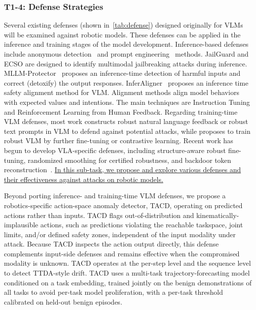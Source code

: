 \subsubsection{T1-4: Defense Strategies} \label{sec:t1_4}



 Several existing defenses (shown in~\autoref{tab:defense}) designed originally for VLMs will be examined against robotic models.
These defenses can be applied in the inference and training stages of the model development.
Inference-based defenses include anonymous detection~\cite{zhang2023mutation,gou2024eyes,pi2024mllm} and prompt engineering~\cite{wu2023jailbreaking,wang2024adashield,chen2023can} methods.%
JailGuard \cite{zhang2023mutation} and ECSO \cite{gou2024eyes} are designed to identify multimodal jailbreaking attacks during inference.
MLLM-Protector~\cite{pi2024mllm} proposes an inference-time detection of harmful inputs and correct (detoxify) the output responses. InferAligner~\cite{wang2024inferaligner} proposes an inference time safety alignment method for VLM. 
Alignment methods align model behaviors with expected values and intentions. The main techniques are Instruction Tuning and Reinforcement Learning from Human Feedback.
Regarding training-time VLM defenses, most work \cite{chen2023dress,zhang2023adversarial,li2024one} constructs robust natural language feedback or robust text prompts in VLM to defend against potential attacks, while \cite{li2024red,yang2024robust} proposes to train robust VLM by further fine-tuning or contrastive learning.
Recent work has begun to develop VLA-specific defenses, including structure-aware robust fine-tuning, randomized smoothing for certified robustness, and backdoor token reconstruction~\cite{zhang2026structure,seferis2025randomized,li2026whenattention}.
{\ul{In this sub-task, we propose and explore various defenses and their effectiveness against attacks on robotic models.}}


 Beyond porting inference- and training-time VLM defenses, we propose 
a robotics-specific action-space anomaly detector, TACD, operating on predicted actions rather than inputs. 
TACD flags out-of-distribution and kinematically-implausible actions, such as predictions violating the reachable taskspace, joint limits, and/or defined safety zones, independent of the input modality under attack. Because TACD inspects the action output directly, this defense complements input-side defenses and remains effective when the compromised modality is unknown. %
TACD operates at the per-step level and the sequence level to detect TTDA-style drift. TACD uses a multi-task trajectory-forecasting model conditioned on a task embedding, trained jointly on the benign demonstrations of all tasks to avoid per-task model proliferation, with a per-task threshold calibrated on held-out benign episodes.


